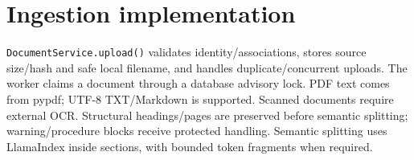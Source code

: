 \section{Ingestion implementation}
\texttt{DocumentService.upload()} validates identity/associations, stores source size/hash and safe local filename, and handles duplicate/concurrent uploads. The worker claims a document through a database advisory lock. PDF text comes from pypdf; UTF-8 TXT/Markdown is supported. Scanned documents require external OCR. Structural headings/pages are preserved before semantic splitting; warning/procedure blocks receive protected handling. Semantic splitting uses LlamaIndex inside sections, with bounded token fragments when required.
